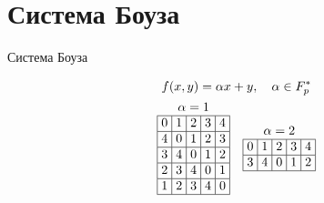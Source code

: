 \documentclass[8pt, hyperref={pdftex,unicode}, green]{beamer}
\begin{document}
\section{Система Боуза}
\begin{frame}{Система Боуза}
    
    \begin{block}{}
    \begin{gather*}
        f(x,y)= \alpha x + y, \quad \alpha \in F_p^*\\
        \begin{array}{|>{\hspace{-2pt}}c<{\hspace{-2pt}}|>{\hspace{-2pt}}c<{\hspace{-2pt}}|>{\hspace{-2pt}}c<{\hspace{-2pt}}|>{\hspace{-2pt}}c<{\hspace{-2pt}}|>{\hspace{-2pt}}c<{\hspace{-2pt}}|} 
            \multicolumn{5}{c}{\alpha = 1} \\ \hline
            0 & 1 & 2 & 3 & 4 \\ \hline
            4 & 0 & 1 & 2 & 3 \\ \hline
            3 & 4 & 0 & 1 & 2 \\ \hline
            2 & 3 & 4 & 0 & 1 \\ \hline
            1 & 2 & 3 & 4 & 0 \\ \hline
        \end{array}\hspace{1em}
        \begin{array}{|>{\hspace{-2pt}}c<{\hspace{-2pt}}|>{\hspace{-2pt}}c<{\hspace{-2pt}}|>{\hspace{-2pt}}c<{\hspace{-2pt}}|>{\hspace{-2pt}}c<{\hspace{-2pt}}|>{\hspace{-2pt}}c<{\hspace{-2pt}}|} 
            \multicolumn{5}{c}{\alpha = 2} \\ \hline
            0 & 1 & 2 & 3 & 4 \\ \hline
            3 & 4 & 0 & 1 & 2 \\ \hline

\end{array}
\end{gather*}
\end{block}
\end{frame}
\end{document}
